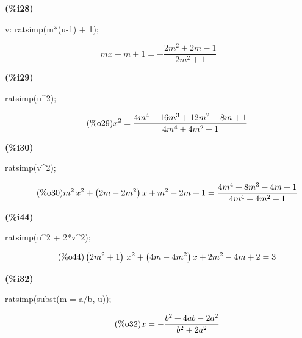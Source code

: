 \documentclass[11pt]{amsart}
\begin{document}
\noindent
\begin{minipage}[t]{8ex}\color{red}\bf
(\%{}i28) 
\end{minipage}
\begin{minipage}[t]{\textwidth}\color{blue}
v: ratsimp(m*(u-1) + 1);
\end{minipage}
\[\displaystyle
\tag{v}\label{v}
mx-m+1=-\frac{2{{m}^{2}}+2m-1}{2{{m}^{2}}+1}\mbox{}
\]


\noindent
\begin{minipage}[t]{8ex}\color{red}\bf
(\%{}i29) 
\end{minipage}
\begin{minipage}[t]{\textwidth}\color{blue}
ratsimp(u\^{}2);
\end{minipage}
\[\displaystyle
\tag{\%{}o29}\label{o29} 
{{x}^{2}}=\frac{4{{m}^{4}}-16{{m}^{3}}+12{{m}^{2}}+8m+1}{4{{m}^{4}}+4{{m}^{2}}+1}\mbox{}
\]


\noindent
\begin{minipage}[t]{8ex}\color{red}\bf
(\%{}i30) 
\end{minipage}
\begin{minipage}[t]{\textwidth}\color{blue}
ratsimp(v\^{}2);
\end{minipage}
\[\displaystyle
\tag{\%{}o30}\label{o30} 
{{m}^{2}}\,{{x}^{2}}+\left( 2m-2{{m}^{2}}\right) x+{{m}^{2}}-2m+1=\frac{4{{m}^{4}}+8{{m}^{3}}-4m+1}{4{{m}^{4}}+4{{m}^{2}}+1}\mbox{}
\]


\noindent
\begin{minipage}[t]{8ex}\color{red}\bf
(\%{}i44) 
\end{minipage}
\begin{minipage}[t]{\textwidth}\color{blue}
ratsimp(u\^{}2 + 2*v\^{}2);
\end{minipage}
\[\displaystyle
\tag{\%{}o44}\label{o44} 
\left( 2{{m}^{2}}+1\right) \,{{x}^{2}}+\left( 4m-4{{m}^{2}}\right) x+2{{m}^{2}}-4m+2=3\mbox{}
\]


\noindent
\begin{minipage}[t]{8ex}\color{red}\bf
(\%{}i32) 
\end{minipage}
\begin{minipage}[t]{\textwidth}\color{blue}
ratsimp(subst(m = a/b, u));
\end{minipage}
\[\displaystyle
\tag{\%{}o32}\label{o32} 
x=-\frac{{{b}^{2}}+4ab-2{{a}^{2}}}{{{b}^{2}}+2{{a}^{2}}}\mbox{}
\]
\end{document}
